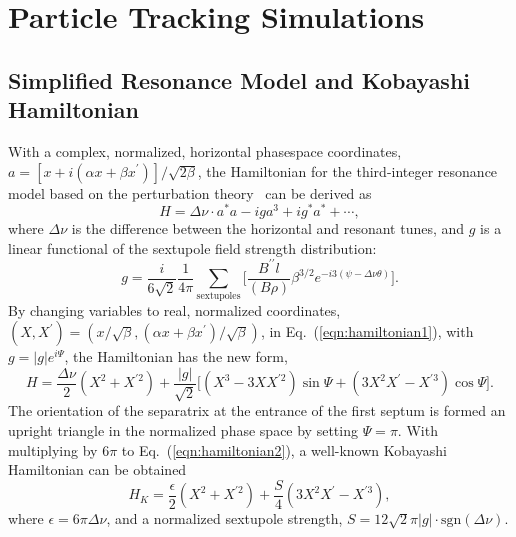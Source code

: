 \documentclass[review,1p,number,fleqn,a4paper]{elsarticle}
\begin{document}
\section{\label{sec:tracking}Particle Tracking Simulations}

\subsection{\label{sec:model}Simplified Resonance Model and Kobayashi Hamiltonian}

With a complex, normalized, horizontal phasespace coordinates, $a = [x + i (\alpha x + \beta x^{\prime})] / \sqrt{2 \beta}$, the Hamiltonian for the third-integer resonance model based on the perturbation theory~\cite{preliminary} can be derived as
\begin{equation}
  H = \Delta \nu \cdot a^{*} a - i g a^{3} + i g^{*} a^{*} + \cdots,
\label{eqn:hamiltonian1}
\end{equation}
where $\Delta \nu$ is the difference between the horizontal and resonant tunes, and $g$ is  a linear functional of the sextupole field strength distribution:
\begin{equation*}
  g = \frac{i}{6 \sqrt{2}} \frac{1}{4 \pi} \sum_{\text{sextupoles}}
      \Bigg[
        \frac{B^{\prime\prime} l}{(B\rho)} \beta^{3/2}
        e^{-i 3(\psi - \Delta \nu \theta)}
      \Bigg].
\end{equation*}
By changing variables to real, normalized coordinates, $(X, X^{\prime}) = (x/\sqrt{\beta}, (\alpha x + \beta x^{\prime}) / \sqrt{\beta})$, in Eq.~(\ref{eqn:hamiltonian1}), with $g = |g| e^{i \Psi}$, the Hamiltonian has the new form,
\begin{equation}
  H = \frac{\Delta \nu}{2} \left( X^{2} + X^{\prime2} \right)
    + \frac{|g|}{\sqrt{2}}
      \Big[
        \left( X^{3} - 3 X X^{\prime 2} \right) \sin{\Psi}
      + \left( 3 X^{2} X^{\prime} - X^{\prime 3} \right) \cos{\Psi}
      \Big].
\label{eqn:hamiltonian2}
\end{equation}
The orientation of the separatrix at the entrance of the first septum is formed an upright triangle in the normalized phase space by setting $\Psi = \pi$. With multiplying by $6 \pi$ to Eq.~(\ref{eqn:hamiltonian2}), a well-known Kobayashi Hamiltonian can be obtained
\begin{equation}
  H_{K} = \frac{\epsilon}{2} \left( X^{2} + X^{\prime2} \right)
    + \frac{S}{4} \left( 3 X^{2} X^{\prime} - X^{\prime 3} \right),
\label{eqn:kobayashi}
\end{equation}
where $\epsilon = 6\pi \Delta \nu$, and a normalized sextupole strength, $S = 12\sqrt{2} \pi |g| \cdot \text{sgn}(\Delta \nu)$. 
\end{document}

